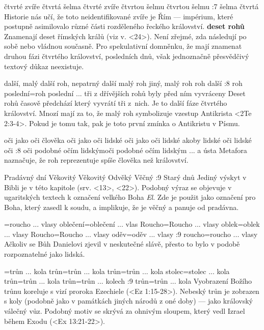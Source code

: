    {čtvrté zvíře}   %
   {čtvrtá šelma}   %
   {čtvrté zvíře}   %
   {čtvrtou šelmu}   %
   {čtvrtou šelmu}   %
:7 {šelma čtvrtá}
     Historie nás učí, že toto neidentifikované zvíře je Řím --- impérium, které postupně
     asimilovalo různé části rozděleného řeckého království. 
     {\bf deset rohů} Znamenají deset římských králů (viz v. <24>). Není zřejmé, zda následují po      sobě nebo vládnou současně. Pro spekulativní domněnku, že mají znamenat druhou fázi čtvrtého    království,  posledních dnů, však jednoznačně přesvědčivý textový      důkaz neexistuje. 

   {další, malý}   %
   {další roh, nepatrný}   %
   {další malý roh}   %
   {jiný, malý roh}   %
   {roh další}   %
:8 {roh poslední}={roh poslední ... tři z dřívějších rohů byly před ním vyvráceny}
     Deset rohů časově předchází  který vyvrátí tři z~nich. Je to další fáze
     čtvrtého království. Mnozí mají za to, že malý roh symbolizuje vzestup Antikrista 
     <2Te 2:3-4>. Pokud je tomu tak, pak je toto první zmínka o Antikristu v Písmu.  

   {oči jako oči člověka}   %
   {oči jako oči lidské}   %
   {oči jako oči lidské}   %
   {akoby lidské oči}   %
   {lidské oči}   %
:8 {oči podobné očím lidským}{oči podobné očím lidským ... a ústa}
     Metafora naznačuje, že roh reprezentuje spíše člověka než království. 
     
   {Pradávný dní}   %
   {Věkovitý}   %
   {Věkovitý}   %
   {Odvěký}   %
   {Věčný}   %
:9 {Starý dnů} Jediný výskyt v Bibli je v této kapitole (srv. <13>, <22>). Podobný výraz se objevuje v ugaritských textech k označení velkého Boha  {\em El}. Zde je použit jako označení pro Boha, který zasedl k soudu, a implikuje, že je věčný a  panuje od pradávna.

={roucho ... vlasy}   %
   {oblečení}={oblečení ... vlas}   %
   {Roucho}={Roucho ... vlasy}    %
   {oblek}={oblek ... vlasy}    %
   {Roucho}={Roucho ... vlasy}    %
   {oděv}={oděv ... vlasy}    %
:9 {roucho}={roucho ... vlasy} Ačkoliv se Bůh Danielovi zjevil v neskutečné slávě, přesto to bylo v podobě rozpoznatelné jako lidská.

={trůn ... kola} %
    {trůn}={trůn ... kola} %
     {trůn}={trůn ... kola}  %
     {stolec}={stolec ... kola} %
     {trůn}={trůn ... kola}  %
     {trůn}={trůn ... kolech}  %
:9 {trůn}={trůn ... kola} Vyobrazení Božího trůnu koreluje s vizí proroka Ezechiele (<Ez 1:15-28>).
      Nebeský trůn je zobrazen s koly (podobně jako v památkách jiných národů z oné doby) --- jako královský válečný vůz. Podobný motiv se skrývá za ohnivým sloupem, který vedl Izrael během Exodu (<Ex 13:21-22>).

